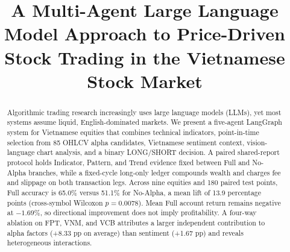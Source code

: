 \begin{frontmatter}


\title{A Multi-Agent Large Language Model Approach to Price-Driven Stock Trading in the Vietnamese Stock Market}







\begin{abstract}
Algorithmic trading research increasingly uses large language models (LLMs), yet most systems assume liquid, English-dominated markets. We present a five-agent LangGraph system for Vietnamese equities that combines technical indicators, point-in-time selection from 85 OHLCV alpha candidates, Vietnamese sentiment context, vision-language chart analysis, and a binary LONG/SHORT decision. A paired shared-report protocol holds Indicator, Pattern, and Trend evidence fixed between Full and No-Alpha branches, while a fixed-cycle long-only ledger compounds wealth and charges fee and slippage on both transaction legs. Across nine equities and 180 paired test points, Full accuracy is 65.0\% versus 51.1\% for No-Alpha, a mean lift of 13.9 percentage points (cross-symbol Wilcoxon $p=0.0078$). Mean Full account return remains negative at $-1.69\%$, so directional improvement does not imply profitability. A four-way ablation on FPT, VNM, and VCB attributes a larger independent contribution to alpha factors (+8.33 pp on average) than sentiment (+1.67 pp) and reveals heterogeneous interactions.
\end{abstract}


\end{frontmatter}
